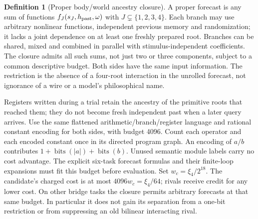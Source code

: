 \documentclass[11pt,a4paper]{article}
\theoremstyle{definition}
\newtheorem{definition}[theorem]{Definition}
\begin{document}
\begin{definition}[Proper body/world ancestry closure]
\label{def:bridge-proper-ancestry-closure}
A proper forecast is any sum of functions $f_J(s_J,h_{\rm past},\omega)$
with $J\subsetneq\{1,2,3,4\}$. Each branch may use arbitrary nonlinear
functions, independent previous memory and randomization; it lacks a joint
dependence on at least one freshly prepared root. Branches can be shared,
mixed and combined in parallel with stimulus-independent coefficients.
The closure admits all such sums, not just two or three components, subject
to a common descriptive budget. Both sides have the same input information.
The restriction is the absence of a four-root interaction in the unrolled
forecast, not ignorance of a wire or a model's philosophical name.

Registers written during a trial retain the ancestry of the primitive roots
that reached them; they do not become fresh independent past when a later
query arrives. Use the same flattened arithmetic/branch/register language and rational
constant encoding for both sides, with budget 4096. Count each operator and
each encoded constant once in its directed program graph. An encoding of
$a/b$ contributes $1+\operatorname{bits}(|a|)+\operatorname{bits}(b)$.
Unused semantic module labels carry no cost advantage. The explicit
six-task forecast formulas and their finite-loop expansions must fit this
budget before evaluation. Set $w_c=\xi_4/2^{18}$. The candidate's charged
cost is at most $4096w_c=\xi_4/64$; rivals receive credit for any lower cost.
On other bridge tasks the closure permits arbitrary forecasts at that same
budget. In particular it does not gain its separation from a one-bit
restriction or from suppressing an old bilinear interacting rival.
\end{definition}
\end{document}
